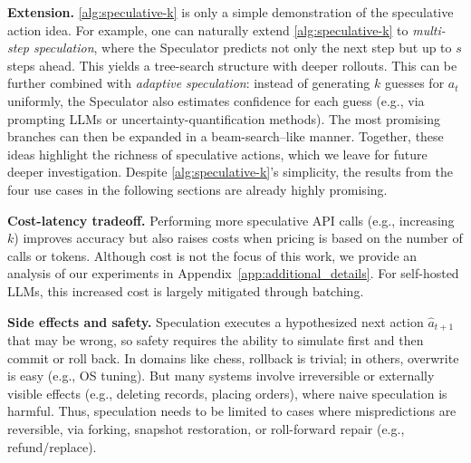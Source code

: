 \textbf{Extension.} \cref{alg:speculative-k} is only a simple demonstration of the speculative action idea. For example, one can naturally extend \cref{alg:speculative-k} to \emph{multi-step speculation}, where the Speculator predicts not only the next step but up to $s$ steps ahead. This yields a tree-search structure with deeper rollouts. This can be further combined with \emph{adaptive speculation}: instead of generating $k$ guesses for $a_t$ uniformly, the Speculator also estimates confidence for each guess (e.g., via prompting LLMs or uncertainty-quantification methods). The most promising branches can then be expanded in a beam-search–like manner. Together, these ideas highlight the richness of speculative actions, which we leave for future deeper investigation.  Despite \cref{alg:speculative-k}'s simplicity, the results from the four use cases in the following sections are already highly promising.


\textbf{Cost-latency tradeoff.} Performing more speculative API calls (e.g., increasing $k$) improves accuracy but also raises costs when pricing is based on the number of calls or tokens. Although cost is not the focus of this work, we provide an analysis of our experiments in Appendix~\ref{app:additional_details}. For self-hosted LLMs, this increased cost is largely mitigated through batching. 

\textbf{Side effects and safety.}
Speculation executes a hypothesized next action $\hat a_{t+1}$ that may be wrong, so safety requires the ability to simulate first and then commit or roll back. In domains like chess, rollback is trivial; in others, overwrite is easy (e.g., OS tuning). But many systems involve irreversible or externally visible effects (e.g., deleting records, placing orders), where naive speculation is harmful. Thus, speculation needs to be limited to cases where mispredictions are reversible, via forking, snapshot restoration, or roll-forward repair (e.g., refund/replace).